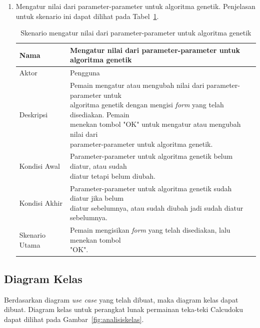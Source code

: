 \begin{enumerate}
\item Mengatur nilai dari parameter-parameter untuk algoritma genetik. Penjelasan untuk skenario ini dapat dilihat pada Tabel~\ref{tab:analisissetparameters}.

\begin{table}
\centering
\captionsetup{justification=centering}
\caption[Skenario mengatur nilai dari parameter-parameter untuk algoritma genetik]{Skenario mengatur nilai dari parameter-parameter untuk algoritma genetik}
\begin{tabular}{| l || l |}
\hline
Nama & Mengatur nilai dari parameter-parameter untuk algoritma genetik \\
\hline
Aktor & Pengguna \\
\hline
Deskripsi & \makecell[l]{Pemain mengatur atau mengubah nilai dari parameter-parameter untuk \\ algoritma genetik dengan mengisi \textit{form} yang telah disediakan. Pemain \\ menekan tombol "OK" untuk mengatur atau mengubah nilai dari \\ parameter-parameter untuk algoritma genetik.} \\
\hline
Kondisi Awal & \makecell[l]{Parameter-parameter untuk algoritma genetik belum diatur, atau sudah \\ diatur tetapi belum diubah.} \\
\hline
Kondisi Akhir & \makecell[l]{Parameter-parameter untuk algoritma genetik sudah diatur jika belum \\ diatur sebelumnya, atau sudah diubah jadi sudah diatur sebelumnya.} \\
\hline
Skenario Utama & \makecell[l]{Pemain mengisikan \textit{form} yang telah disediakan, lalu menekan tombol \\ "OK".} \\
\hline
\end{tabular}
\label{tab:analisissetparameters}
\end{table}

\end{enumerate}

\subsection{Diagram Kelas}
\label{sec:analisiskelas}

Berdasarkan diagram \textit{use case} yang telah dibuat, maka diagram kelas dapat dibuat. Diagram kelas untuk perangkat lunak permainan teka-teki Calcudoku dapat dilihat pada Gambar~\ref{fig:analisiskelas}.

